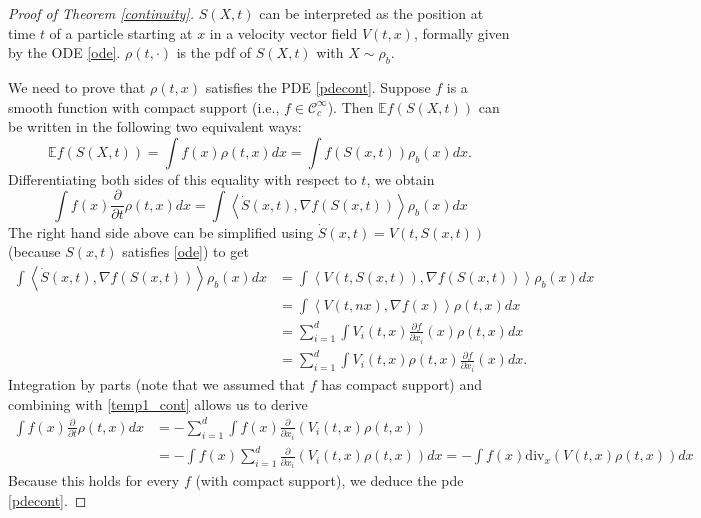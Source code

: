\documentclass{scrartcl}
\newcommand{\E}{{\mathbb E}}
\newcommand{\C}{{\mathcal{C}}}
\begin{document}
\begin{proof}[Proof of Theorem \ref{continuity}]
  $S(X, t)$ can be interpreted as the position at time $t$ of
  a particle starting at $x$ in a velocity vector field $V(t, x)$,
  formally given by the ODE \eqref{ode}. $\rho(t, \cdot)$ is the pdf
  of $S(X, t)$ with $X \sim \rho_b$.  

  We need to prove that $\rho(t,
  x)$ satisfies the PDE \eqref{pdecont}. Suppose $f$ is a smooth
  function with compact support (i.e., $f \in \C_c^{\infty}$). Then
  $\E f(S(X, t))$ can be written in the following two equivalent ways:
  \begin{equation*}
    \E f(S(X, t)) = \int f(x) \rho(t, x) dx = \int f(S(x, t))
    \rho_b(x) dx. 
  \end{equation*}
  Differentiating both sides of this equality with respect to $t$, we
  obtain
  \begin{equation}\label{temp1_cont}
    \int f(x) \frac{\partial}{\partial t} \rho(t, x) dx = \int
    \left<\dot{S}(x, t), \nabla f(S(x, t)) \right> \rho_b(x) dx
  \end{equation}
  The right hand side above can be simplified using $\dot{S}(x, t) =
  V(t, S(x, t))$ (because $S(x, t)$ satisfies \eqref{ode}) to get
  \begin{align*}
    \int \left<\dot{S}(x, t), \nabla f(S(x, t)) \right> \rho_b(x) dx &=
    \int \left<V(t, S(x, t)), \nabla f(S(x, t)) \right> \rho_b(x) dx \\ &=
                                                                          \int
                                                                          \left<V(t,
n                                                                          x),
                                                                          \nabla
                                                                          f(x)
                                                                          \right>
                                                                          \rho(t,
                                                                          x)
                                                                          dx
    \\ 
    &= \sum_{i=1}^d \int V_i(t, x) \frac{\partial f}{\partial x_i}(x)
      \rho(t, x) dx \\
    &= \sum_{i=1}^d \int V_i(t, x) \rho(t, x) \frac{\partial f}{\partial x_i}(x)dx.
  \end{align*}
Integration by parts (note that we assumed that $f$ has compact
support) and combining with \eqref{temp1_cont} allows us to derive
\begin{align*}
  \int f(x) \frac{\partial}{\partial t} \rho(t, x) dx &= - \sum_{i=1}^d
  \int f(x) \frac{\partial}{\partial x_i} \left(V_i(t, x) \rho(t, x)
                                                        \right) \\
  &= -\int f(x) \sum_{i=1}^d \frac{\partial}{\partial x_i}
    \left(V_i(t, x) \rho(t, x) \right) dx = -\int f(x) \text{div}_x
    \left(V(t, x) \rho(t, x) \right) dx
\end{align*}
Because this holds for every $f$ (with compact support), we deduce the
pde \eqref{pdecont}.
\end{proof}
\end{document}
